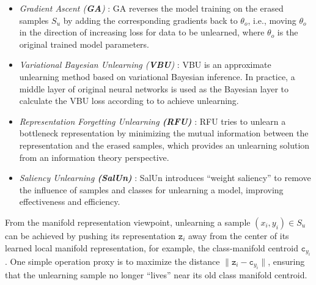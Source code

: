 \begin{itemize}[itemsep=0pt, parsep=0pt, leftmargin=*]
	\item \textit{Gradient Ascent (\textbf{GA})} \citep{graves2021amnesiac,thudi2022unrolling}: GA reverses the model training on the erased samples $S_u$ by adding the corresponding gradients back to $\theta_o$, i.e., moving $\theta_o$ in the direction of increasing loss for data to be unlearned, where $\theta_o$ is the original trained model parameters.
	\item \textit{Variational Bayesian Unlearning (\textbf{VBU})} \citep{nguyen2020variational,nguyen2022markov}: VBU is an approximate unlearning method based on variational Bayesian inference. In practice, a middle layer of original neural networks is used as the Bayesian layer to calculate the VBU loss according to \citep{nguyen2020variational} to achieve unlearning.
	\item  \textit{Representation Forgetting Unlearning \textbf{(RFU)}} \citep{wang2023machine}: RFU tries to unlearn a bottleneck representation by minimizing the mutual information between the representation and the erased samples, which provides an unlearning solution from an information theory perspective. %
	\item  \textit{Saliency Unlearning \textbf{(SalUn)}} \citep{fan2024salun}: SalUn introduces ``weight saliency'' to remove the influence of samples and classes for unlearning a model, improving effectiveness and efficiency.
\end{itemize}

From the manifold representation viewpoint, unlearning a sample $(x_i,y_i) \in S_u$ can be achieved by pushing its representation $\texttt{z}_i$ away from the center of its learned local manifold representation, for example, the class-manifold centroid $\texttt{c}_{y_i}$. One simple operation proxy is to maximize the distance $\| \texttt{z}_i - \texttt{c}_{y_i} \|$, ensuring that the unlearning sample no longer ``lives'' near its old class manifold centroid. %

